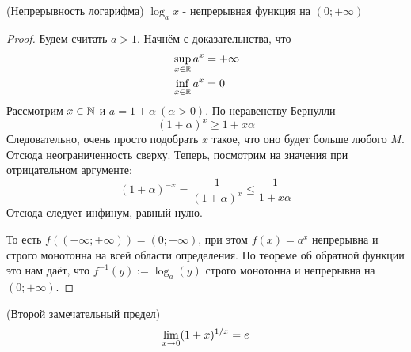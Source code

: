 \begin{corollary} (Непрерывность логарифма)
	$\log_a x$ - непрерывная функция на $(0; +\infty)$
\end{corollary}

\begin{proof}
	Будем считать $a > 1$. Начнём с доказательнства, что
	\begin{align*}
		&\sup\limits_{x \in \mathbb{R}} a^x = +\infty
		\\
		&\inf\limits_{x \in \mathbb{R}} a^x = 0
	\end{align*}
	Рассмотрим $x \in \mathbb{N}$ и $a = 1 + \alpha\ (\alpha > 0)$. По неравенству Бернулли
	\[
		(1 + \alpha)^x \ge 1 + x\alpha
	\]
	Следовательно, очень просто подобрать $x$ такое, что оно будет больше любого $M$. Отсюда неограниченность сверху. Теперь, посмотрим на значения при отрицательном аргументе:
	\[
		(1 + \alpha)^{-x} = \frac{1}{(1 + \alpha)^x} \le \frac{1}{1 + x\alpha}
	\]
	Отсюда следует инфинум, равный нулю.
	
	То есть $f((-\infty; +\infty)) = (0; +\infty)$, при этом $f(x) = a^x$ непрерывна и строго монотонна на всей области определения. По теореме об обратной функции это нам даёт, что $f^{-1}(y) := \log_a (y)$ строго монотонна и непрерывна на $(0; +\infty)$.
\end{proof}

\begin{theorem} (Второй замечательный предел) \\
	$$
		\lim\limits_{x \to 0} (1 + x)^{1 / x} = e
	$$
\end{theorem}

